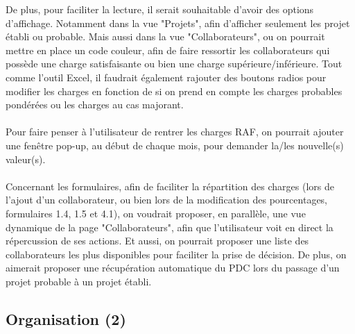 \documentclass[french]{report}
\begin{document}
De plus, pour faciliter la lecture, il serait souhaitable d’avoir des options
d’affichage. Notamment dans la vue "Projets", afin d'afficher seulement les
projet établi ou probable. Mais aussi dans la vue "Collaborateurs", ou on
pourrait mettre en place un code couleur, afin de faire ressortir les
collaborateurs qui possède une charge satisfaisante ou bien une charge
supérieure/inférieure. Tout comme l’outil Excel, il faudrait également rajouter
des boutons radios pour modifier les charges en fonction de si on prend en
compte les charges probables pondérées ou les charges au cas majorant.\\\\ Pour
faire penser à l’utilisateur de rentrer les charges RAF, on pourrait ajouter une
fenêtre pop-up, au début de chaque mois, pour demander la/les nouvelle(s)
valeur(s).\\\\ Concernant les formulaires, afin de faciliter la répartition des
charges (lors de l'ajout d'un collaborateur, ou bien lors de la modification
des pourcentages, formulaires 1.4, 1.5 et 4.1), on voudrait proposer, en
parallèle, une vue dynamique de la page "Collaborateurs", afin que l’utilisateur
voit en direct la répercussion de ses actions. Et aussi, on pourrait proposer
une liste des collaborateurs les plus disponibles pour faciliter la prise de
décision. De plus, on aimerait proposer une récupération automatique du PDC lors
du passage d’un projet probable à un projet établi.

\subsection{Organisation (2)}
\end{document}
